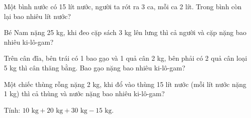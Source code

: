 \begin{ex}
Một bình nước có 15 lít nước, người ta rót ra 3 ca, mỗi ca 2 lít. Trong bình còn lại bao nhiêu lít nước?
\end{ex}

\begin{ex}
Bé Nam nặng 25 kg, khi đeo cặp sách 3 kg lên lưng thì cả người và cặp nặng bao nhiêu ki-lô-gam?
\end{ex}

\begin{ex}
Trên cân đĩa, bên trái có 1 bao gạo và 1 quả cân 2 kg, bên phải có 2 quả cân loại 5 kg thì cân thăng bằng. Bao gạo nặng bao nhiêu ki-lô-gam?
\end{ex}

\begin{ex}
Một chiếc thùng rỗng nặng 2 kg, khi đổ vào thùng 15 lít nước (mỗi lít nước nặng 1 kg) thì cả thùng và nước nặng bao nhiêu ki-lô-gam?
\end{ex}

\begin{ex}
Tính: $10\text{ kg} + 20\text{ kg} + 30\text{ kg} - 15\text{ kg}$.
\end{ex}

